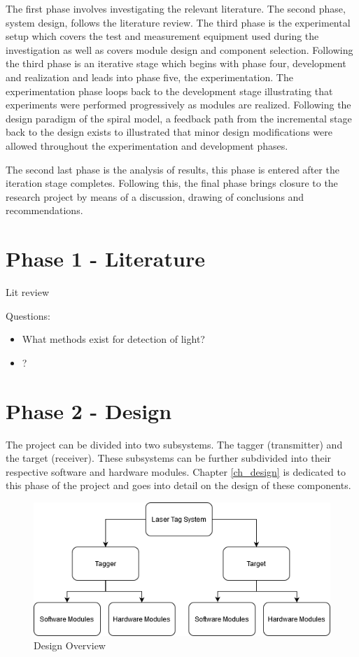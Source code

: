 The first phase involves investigating the relevant literature. The second phase, system design, follows the literature review. The third phase is the experimental setup which covers the test and measurement equipment used during the investigation as well as covers module design and component selection. Following the third phase is an iterative stage which begins with phase four, development and realization and leads into phase five, the experimentation. The experimentation phase loops back to the development stage illustrating that experiments were performed progressively as modules are realized. Following the design paradigm of the spiral model, a feedback path from the incremental stage back to the design exists to illustrated that minor design modifications were allowed throughout the experimentation and development phases.

The second last phase is the analysis of results, this phase is entered after the iteration stage completes. Following this, the final phase brings closure to the research project by means of a discussion, drawing of conclusions and recommendations.

\section{Phase 1 - Literature}

Lit review

Questions:

\begin{itemize}
	\item What methods exist for detection of light?
	\item ?
\end{itemize}



\section{Phase 2 - Design}

The project can be divided into two subsystems. The tagger (transmitter) and the target (receiver). These subsystems can be further subdivided into their respective software and hardware modules. Chapter \ref{ch_design} is dedicated to this phase of the project and goes into detail on the design of these components.

\begin{figure}[H]
	\centering
	\includegraphics[width=0.7\linewidth]{figures/methodology/design_overview}
	\caption{Design Overview}
	\label{fig:designoverview}
\end{figure}


